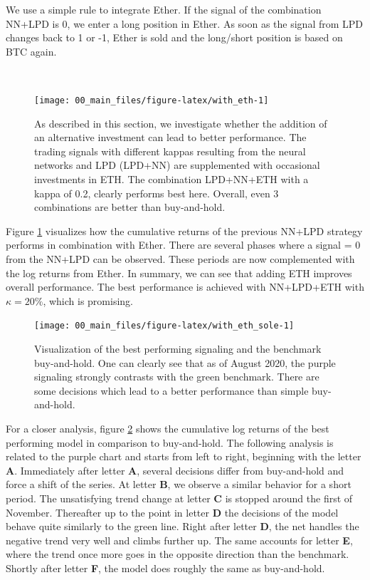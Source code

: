 \documentclass[
]{article}
\begin{document}
We use a simple rule to integrate Ether. If the signal of the
combination NN+LPD is 0, we enter a long position in Ether. As soon as
the signal from LPD changes back to 1 or -1, Ether is sold and the
long/short position is based on BTC again.

~

\begin{figure}

{\centering \texttt{[image: 00\_main\_files/figure-latex/with\_eth-1]} 

}

\caption{As described in this section, we investigate whether the addition of an alternative investment can lead to better performance. The trading signals with different kappas resulting from the neural networks and LPD (LPD+NN) are supplemented with occasional investments in ETH. The combination LPD+NN+ETH with a kappa of 0.2, clearly performs best here. Overall, even 3 combinations are better than buy-and-hold.}\label{fig:with_eth}
\end{figure}

Figure \ref{fig:with_eth} visualizes how the cumulative returns of the
previous NN+LPD strategy performs in combination with Ether. There are
several phases where a signal = 0 from the NN+LPD can be observed. These
periods are now complemented with the log returns from Ether. In
summary, we can see that adding ETH improves overall performance. The
best performance is achieved with NN+LPD+ETH with \(\kappa = 20 \%\),
which is promising.

\newpage

\begin{figure}

{\centering \texttt{[image: 00\_main\_files/figure-latex/with\_eth\_sole-1]} 

}

\caption{Visualization of the best performing signaling and the benchmark buy-and-hold. One can clearly see that as of August 2020, the purple signaling strongly contrasts with the green benchmark. There are some decisions which lead to a better performance than simple buy-and-hold.}\label{fig:with_eth_sole}
\end{figure}

For a closer analysis, figure \ref{fig:with_eth_sole} shows the
cumulative log returns of the best performing model in comparison to
buy-and-hold. The following analysis is related to the purple chart and
starts from left to right, beginning with the letter \textbf{A}.
Immediately after letter \textbf{A}, several decisions differ from
buy-and-hold and force a shift of the series. At letter \textbf{B}, we
observe a similar behavior for a short period. The unsatisfying trend
change at letter \textbf{C} is stopped around the first of November.
Thereafter up to the point in letter \textbf{D} the decisions of the
model behave quite similarly to the green line. Right after letter
\textbf{D}, the net handles the negative trend very well and climbs
further up. The same accounts for letter \textbf{E}, where the trend
once more goes in the opposite direction than the benchmark. Shortly
after letter \textbf{F}, the model does roughly the same as
buy-and-hold.
\end{document}
